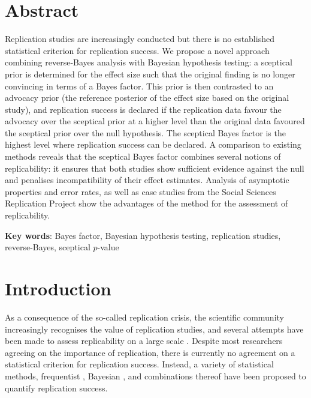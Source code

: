 \section*{Abstract}

Replication studies are increasingly conducted but there is no established
statistical criterion for replication success. We propose a novel approach
combining reverse-Bayes analysis with Bayesian hypothesis testing: a sceptical
prior is determined for the effect size such that the original finding is no
longer convincing in terms of a Bayes factor. This prior is then contrasted to
an advocacy prior (the reference posterior of the effect size based on the
original study), and replication success is declared if the replication data
favour the advocacy over the sceptical prior at a higher level than the original
data favoured the sceptical prior over the null hypothesis. The sceptical Bayes
factor is the highest level where replication success can be declared. A
comparison to existing methods reveals that the sceptical Bayes factor combines
several notions of replicability: it ensures that both studies show sufficient
evidence against the null and penalises incompatibility of their effect
estimates. Analysis of asymptotic properties and error rates, as well as case
studies from the Social Sciences Replication Project show the advantages of the
method for the assessment of replicability.

\textbf{Key words}:
Bayes factor, Bayesian hypothesis testing, replication studies, reverse-Bayes,
sceptical $p$-value

\section{Introduction}
As a consequence of the so-called replication crisis, the scientific community
increasingly recognises the value of replication studies, and several attempts
have been made to assess replicability on a large scale \citep{Errington2014,
  Klein2014, Opensc2015, Camerer2016, Camerer2018, Cova2018}. Despite most
researchers agreeing on the importance of replication, there is currently no
agreement on a statistical criterion for replication success. Instead, a variety
of statistical methods, frequentist \citep{Simonsohn2015, Patil2016, Hedges2019,
  Mathur2020}, Bayesian \citep{Bayarri2002b, Bayarri2002, Verhagen2014,
  Johnson2016, Etz2016, vanAert2017, Ly2018, Harms2019}, and combinations
thereof \citep{Held2020, Pawel2020, Held2021} have been proposed to quantify
replication success.

